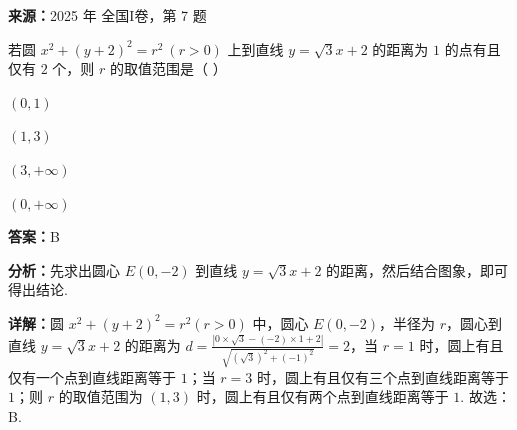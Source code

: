 \begin{question}[points=5]
\textbf{来源：}2025 年 全国I卷，第 7 题\par
若圆 $x^2 + (y+2)^2 = r^2 \ (r>0)$ 上到直线 $y = \sqrt{3}x+2$ 的距离为 $1$ 的点有且仅有 $2$ 个，则 $r$ 的取值范围是（ ）
\begin{choices}
  \item $(0,1)$
  \item $(1,3)$
  \item $(3,+\infty)$
  \item $(0,+\infty)$
\end{choices}
\begin{solution}
\textbf{答案：}B

\textbf{分析：}先求出圆心 $E(0,-2)$ 到直线 $y = \sqrt{3}x+2$ 的距离，然后结合图象，即可得出结论.

\textbf{详解：}圆 $x^2+(y+2)^2=r^2(r>0)$ 中，圆心 $E(0,-2)$，半径为 $r$，圆心到直线 $y = \sqrt{3}x+2$ 的距离为 $d = \frac{|0\times\sqrt{3} - (-2)\times1 + 2|}{\sqrt{(\sqrt{3})^2+(-1)^2}} = 2$，当 $r=1$ 时，圆上有且仅有一个点到直线距离等于 $1$；当 $r=3$ 时，圆上有且仅有三个点到直线距离等于 $1$；则 $r$ 的取值范围为 $(1,3)$ 时，圆上有且仅有两个点到直线距离等于 $1$. 故选：B.
\end{solution}
\end{question}

